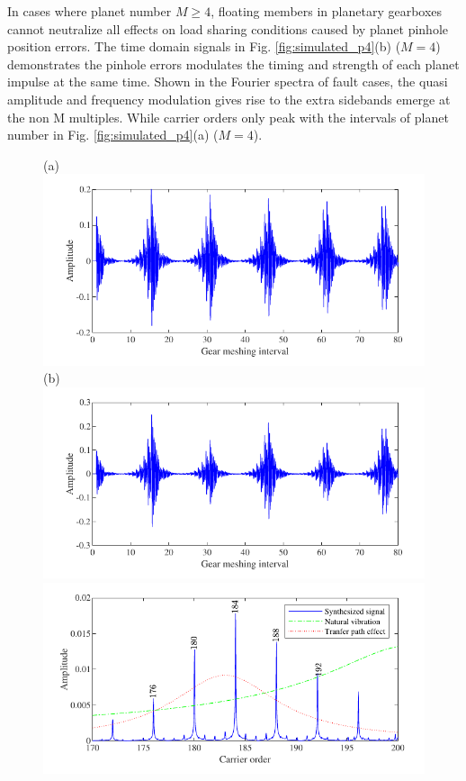 \documentclass[a4paper,fleqn]{cas-sc}%
\begin{document}
\par In cases where planet number $M\geq4$, floating members in planetary gearboxes cannot neutralize all effects on load sharing conditions caused by planet pinhole position errors. The time domain signals in Fig. \ref{fig:simulated_p4}(b) ($M=4$) demonstrates the  pinhole errors modulates the  timing and strength of  each planet impulse at the same time. Shown in the Fourier spectra of fault cases, the quasi amplitude and frequency modulation gives rise to the extra sidebands emerge at the non M multiples. While carrier orders only peak with the intervals of  planet number in Fig. \ref{fig:simulated_p4}(a) ($M=4$).
\begin{figure}[pos=htbp]
    \centering
    (a) \includegraphics[scale=\myscale,valign=t]{Time_p4_normal.pdf}
    (b) \includegraphics[scale=\myscale,valign=t]{Time_p4_fault.pdf}\\
    \hspace*{1.5em}\includegraphics[scale=\myscale,valign=t]{Freq_p4_normal.pdf}

\end{figure}
\end{document}
